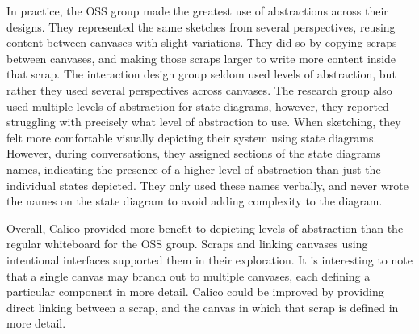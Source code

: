 In practice, the OSS group made the greatest use of abstractions across their designs. They represented the same sketches from several perspectives, reusing content between canvases with slight variations. They did so by copying scraps between canvases, and making those scraps larger to write more content inside that scrap. The interaction design group seldom used levels of abstraction, but rather they used several perspectives across canvases. The research group also used multiple levels of abstraction for state diagrams, however, they reported struggling with precisely what level of abstraction to use. When sketching, they felt more comfortable visually depicting their system using state diagrams. However, during conversations, they assigned sections of the state diagrams names, indicating the presence of a higher level of abstraction than just the individual states depicted. They only used these names verbally, and never wrote the names on the state diagram to avoid adding complexity to the diagram.

Overall, Calico provided more benefit to depicting levels of abstraction than the regular whiteboard for the OSS group. Scraps and linking canvases using intentional interfaces supported them in their exploration. It is interesting to note that a single canvas may branch out to multiple canvases, each defining a particular component in more detail. Calico could be improved by providing direct linking between a scrap, and the canvas in which that scrap is defined in more detail.

%

